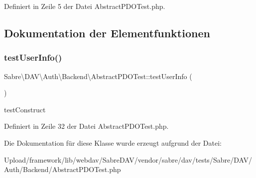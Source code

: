 Definiert in Zeile 5 der Datei Abstract\+P\+D\+O\+Test.\+php.



\subsection{Dokumentation der Elementfunktionen}
\mbox{\label{class_sabre_1_1_d_a_v_1_1_auth_1_1_backend_1_1_abstract_p_d_o_test_aee41b3b2893c3ce490d12121279cdec6}} 
\subsubsection{\texorpdfstring{test\+User\+Info()}{testUserInfo()}}
{\footnotesize\ttfamily Sabre\textbackslash{}\+D\+A\+V\textbackslash{}\+Auth\textbackslash{}\+Backend\textbackslash{}\+Abstract\+P\+D\+O\+Test\+::test\+User\+Info (\begin{DoxyParamCaption}{ }\end{DoxyParamCaption})}

test\+Construct 

Definiert in Zeile 32 der Datei Abstract\+P\+D\+O\+Test.\+php.



Die Dokumentation für diese Klasse wurde erzeugt aufgrund der Datei\+:\begin{DoxyCompactItemize}
\item 
Upload/framework/lib/webdav/\+Sabre\+D\+A\+V/vendor/sabre/dav/tests/\+Sabre/\+D\+A\+V/\+Auth/\+Backend/Abstract\+P\+D\+O\+Test.\+php\end{DoxyCompactItemize}
